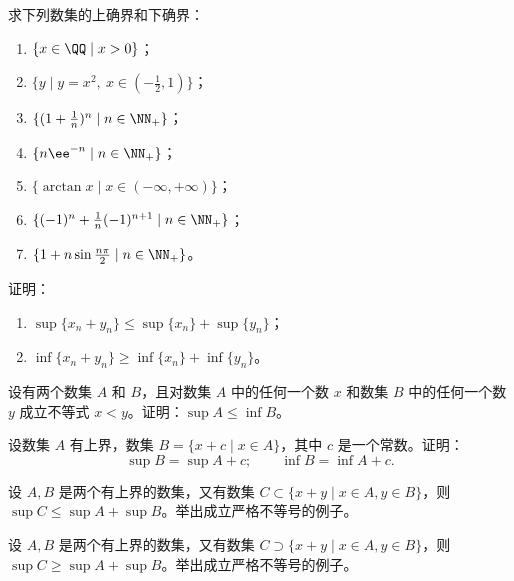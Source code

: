 \begin{xexercise}[4]
求下列数集的上确界和下确界：
  \begin{enumerate}[label=(\arabic*)]
    \item $\{x\in\QQ\mid x>0\}$；
    \item $\{y\mid y=x^2,\ x\in(-\frac12,1)\}$；
    \item $\{(1+\frac1n)^n\mid n\in\NN_+\}$；
    \item $\{n\ee^{-n}\mid n\in\NN_+\}$；
    \item $\{\arctan x\mid x\in(-\infty,+\infty)\}$；
    \item $\{(-1)^n+\frac1n(-1)^{n+1}\mid n\in\NN_+\}$；
    \item $\{1+n\sin\frac{n\pi}{2}\mid n\in\NN_+\}$。
  \end{enumerate}
\end{xexercise}

\begin{xexercise}[5]
证明：
  \begin{enumerate}[label=(\arabic*)]
    \item $\sup\{x_n+y_n\}\leqslant\sup\{x_n\}+\sup\{y_n\}$；
    \item $\inf\{x_n+y_n\}\geqslant\inf\{x_n\}+\inf\{y_n\}$。
  \end{enumerate}
\end{xexercise}

\begin{xexercise}[6]
设有两个数集 $A$ 和 $B$，且对数集 $A$ 中的任何一个数 $x$ 和数集 $B$ 中的任何一个数 $y$ 成立不等式 $x<y$。证明：$\sup A\leqslant\inf B$。
\end{xexercise}

\begin{xexercise}[7]
设数集 $A$ 有上界，数集 $B=\{x+c\mid x\in A\}$，其中 $c$ 是一个常数。证明：
  \[
    \sup B=\sup A+c;\qquad \inf B=\inf A+c.
  \]
\end{xexercise}

\begin{xexercise}[8]
设 $A,B$ 是两个有上界的数集，又有数集 $C\subset\{x+y\mid x\in A,y\in B\}$，则 $\sup C\leqslant\sup A+\sup B$。举出成立严格不等号的例子。
\end{xexercise}

\begin{xexercise}[9]
设 $A,B$ 是两个有上界的数集，又有数集 $C\supset\{x+y\mid x\in A,y\in B\}$，则 $\sup C\geqslant\sup A+\sup B$。举出成立严格不等号的例子。
\end{xexercise}

